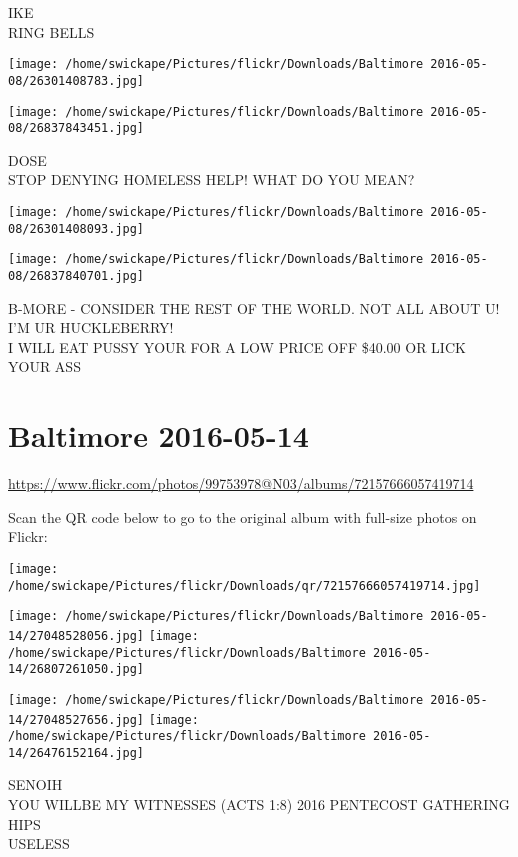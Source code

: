 \documentclass[10pt,letterpaper]{article}
\begin{document}
IKE\\
RING BELLS
\pagebreak

\texttt{[image: /home/swickape/Pictures/flickr/Downloads/Baltimore 2016-05-08/26301408783.jpg]}

\vspace{0.25in}
\texttt{[image: /home/swickape/Pictures/flickr/Downloads/Baltimore 2016-05-08/26837843451.jpg]}

DOSE\\
STOP DENYING HOMELESS HELP!  WHAT DO YOU MEAN?
\pagebreak

\texttt{[image: /home/swickape/Pictures/flickr/Downloads/Baltimore 2016-05-08/26301408093.jpg]}

\vspace{0.25in}
\texttt{[image: /home/swickape/Pictures/flickr/Downloads/Baltimore 2016-05-08/26837840701.jpg]}

B{-}MORE {-} CONSIDER THE REST OF THE WORLD.  NOT ALL ABOUT U!  I'M UR HUCKLEBERRY!\\
I WILL EAT PUSSY YOUR FOR A LOW PRICE OFF \$40.00 OR LICK YOUR ASS
\pagebreak

\section*{Baltimore 2016-05-14}

\url{https://www.flickr.com/photos/99753978@N03/albums/72157666057419714}

Scan the QR code below to go to the original album with full-size photos on Flickr:

\texttt{[image: /home/swickape/Pictures/flickr/Downloads/qr/72157666057419714.jpg]}
\pagebreak

\texttt{[image: /home/swickape/Pictures/flickr/Downloads/Baltimore 2016-05-14/27048528056.jpg]}
\texttt{[image: /home/swickape/Pictures/flickr/Downloads/Baltimore 2016-05-14/26807261050.jpg]}

\texttt{[image: /home/swickape/Pictures/flickr/Downloads/Baltimore 2016-05-14/27048527656.jpg]}
\texttt{[image: /home/swickape/Pictures/flickr/Downloads/Baltimore 2016-05-14/26476152164.jpg]}

SENOIH\\
YOU WILLBE MY WITNESSES (ACTS 1:8) 2016 PENTECOST GATHERING\\
HIPS\\
USELESS
\pagebreak
\end{document}
